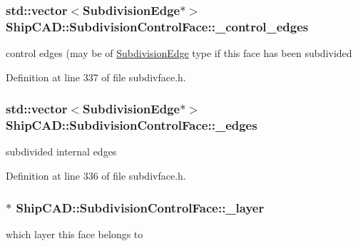 \hypertarget{classShipCAD_1_1SubdivisionControlFace_a33d7e2ecd5f42edf5492efb83df3856b}{
\subsubsection[{\-\_\-control\-\_\-edges}]{\setlength{\rightskip}{0pt plus 5cm}std\-::vector$<${\bf Subdivision\-Edge}$\ast$$>$ Ship\-C\-A\-D\-::\-Subdivision\-Control\-Face\-::\-\_\-control\-\_\-edges\hspace{0.3cm}{\ttfamily [protected]}}}\label{classShipCAD_1_1SubdivisionControlFace_a33d7e2ecd5f42edf5492efb83df3856b}
control edges (may be of \hyperlink{classShipCAD_1_1SubdivisionEdge}{Subdivision\-Edge} type if this face has been subdivided 

Definition at line 337 of file subdivface.\-h.

\hypertarget{classShipCAD_1_1SubdivisionControlFace_a390f626d9999ab3ce48878b223ea1693}{
\subsubsection[{\-\_\-edges}]{\setlength{\rightskip}{0pt plus 5cm}std\-::vector$<${\bf Subdivision\-Edge}$\ast$$>$ Ship\-C\-A\-D\-::\-Subdivision\-Control\-Face\-::\-\_\-edges\hspace{0.3cm}{\ttfamily [protected]}}}\label{classShipCAD_1_1SubdivisionControlFace_a390f626d9999ab3ce48878b223ea1693}
subdivided internal edges 

Definition at line 336 of file subdivface.\-h.

\hypertarget{classShipCAD_1_1SubdivisionControlFace_aee1990d4db7127ba59117a65c1a6ce7e}{
\subsubsection[{\-\_\-layer}]{$\ast$ Ship\-C\-A\-D\-::\-Subdivision\-Control\-Face\-::\-\_\-layer\hspace{0.3cm}{\ttfamily [protected]}}}\label{classShipCAD_1_1SubdivisionControlFace_aee1990d4db7127ba59117a65c1a6ce7e}
which layer this face belongs to 

